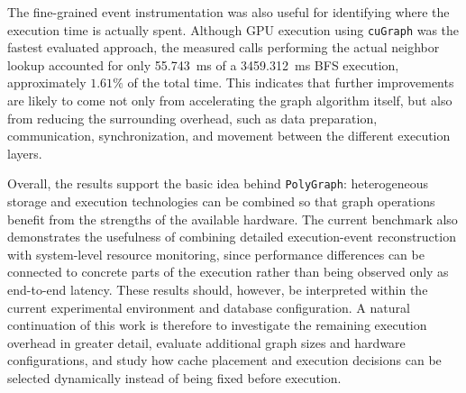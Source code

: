 \documentclass[11pt,a4paper]{article}
\begin{document}
The fine-grained event instrumentation was also useful for identifying where the execution time is actually spent. Although GPU execution using \texttt{cuGraph} was the fastest evaluated approach, the measured calls performing the actual neighbor lookup accounted for only \SI{55.743}{\milli\second} of a \SI{3459.312}{\milli\second} BFS execution, approximately \(1.61\%\) of the total time. This indicates that further improvements are likely to come not only from accelerating the graph algorithm itself, but also from reducing the surrounding overhead, such as data preparation, communication, synchronization, and movement between the different execution layers. 


Overall, the results support the basic idea behind \texttt{PolyGraph}: heterogeneous storage and execution technologies can be combined so that graph operations benefit from the strengths of the available hardware. The current benchmark also demonstrates the usefulness of combining detailed execution-event reconstruction with system-level resource monitoring, since performance differences can be connected to concrete parts of the execution rather than being observed only as end-to-end latency. These results should, however, be interpreted within the current experimental environment and database configuration. A natural continuation of this work is therefore to investigate the remaining execution overhead in greater detail, evaluate additional graph sizes and hardware configurations, and study how cache placement and execution decisions can be selected dynamically instead of being fixed before execution.

\end{document}
